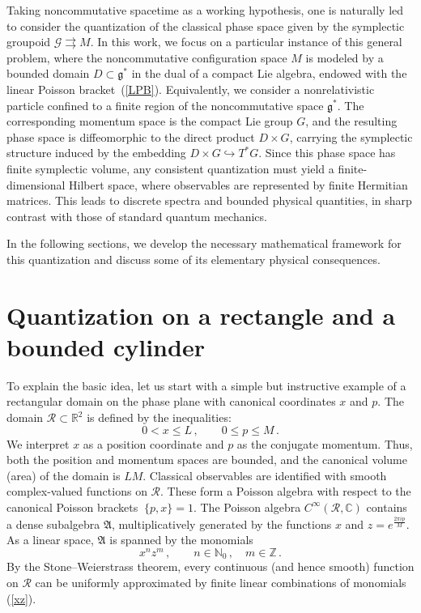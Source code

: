 \documentclass[12pt,a4paper]{article}
\numberwithin{equation}{section}
\theoremstyle{theorem}
\theoremstyle{remark}
\newcommand{\R}{\mathcal{R}}
\newcommand{\fa}{\mathfrak{A}}
\newcommand{\cc}{\mathbb{C}}
\begin{document}
Taking noncommutative spacetime as a working hypothesis, one is naturally led to consider the quantization of the classical phase space given by the symplectic groupoid $\mathcal{G} \rightrightarrows M$.
In this work, we focus on a particular instance of this general problem, where the noncommutative configuration space $M$ is modeled by a bounded domain $
D \subset \mathfrak{g}^\ast
$ 
in the dual of a compact Lie algebra, endowed with the linear Poisson bracket~(\ref{LPB}). Equivalently, we consider a nonrelativistic particle confined to a finite region of the noncommutative space $\mathfrak{g}^\ast$. The corresponding momentum space is the compact Lie group $G$, and the resulting phase space is diffeomorphic to the direct product 
$
D \times G
$,
carrying  the symplectic structure induced by the embedding
$
D \times G \hookrightarrow  T^\ast G
$. 
Since this phase space has finite symplectic volume, any consistent quantization must yield a finite-dimensional Hilbert space, where observables are represented by finite Hermitian matrices. This leads to discrete spectra and bounded physical quantities, in sharp contrast with those of standard quantum mechanics.


In the following sections, we develop the necessary mathematical framework for this quantization and discuss
some of its elementary physical consequences.


\section{Quantization on a rectangle and a bounded cylinder}\label{RecDom}
To explain the basic idea, let us start with a simple but instructive example of a rectangular domain on the phase plane with canonical coordinates $x$ and $p$. The domain $\R\subset{\mathbb{R}^2}$ is defined by the inequalities:
\begin{equation}
    0< x \leq L\,,\qquad 0\leq p\leq M\,.
\end{equation}
We interpret $x$ as a position coordinate and $p$ as the conjugate momentum. Thus, both the position and momentum spaces are bounded, and the canonical volume (area) of the domain is  $LM$. 
Classical observables are identified with smooth complex-valued functions on $\R$. These form a Poisson algebra with respect to the canonical Poisson brackets $~{\{p,x\}=1}$. The Poisson algebra $C^\infty(\R,\cc)$  contains a dense subalgebra $\fa$, multiplicatively generated by the functions $x$ and $z=e^{\frac{2\pi i p}{M}}$. As a linear space, $\fa$ is spanned by the monomials
\begin{equation}\label{xz}
    x^n z^m\,,\qquad n\in \mathbb{N}_0\,,\quad m\in \mathbb{Z}\,. 
\end{equation}
By the Stone--Weierstrass theorem, every continuous (and hence smooth) function on $\R$ can be uniformly approximated by finite linear combinations of monomials (\ref{xz}). 
\end{document}
